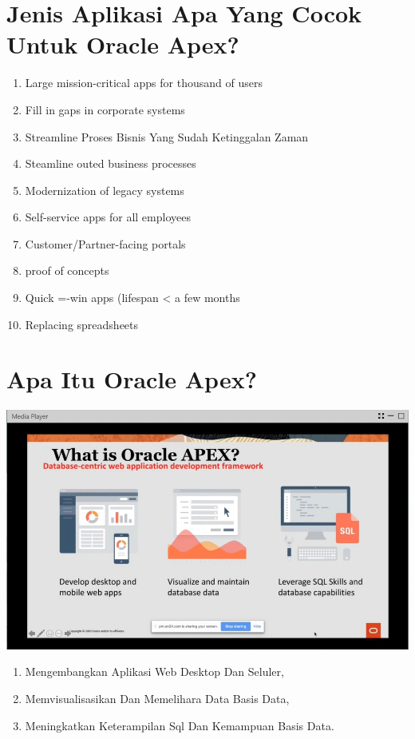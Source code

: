 \documentclass{article}
\begin{document}
\section{Jenis Aplikasi Apa Yang Cocok Untuk Oracle Apex?}
\begin{enumerate}
    \item Large mission-critical apps for thousand of users
    \item Fill in gaps in corporate systems
    \item Streamline Proses Bisnis Yang Sudah Ketinggalan Zaman
    \item Steamline outed business processes
    \item Modernization of legacy systems
    \item Self-service apps for all employees
    \item Customer/Partner-facing portals
    \item proof of concepts
    \item Quick =-win apps (lifespan < a few months
    \item Replacing spreadsheets
\end{enumerate}
\newpage
\section{Apa Itu Oracle Apex?}
\usepackage{Kerangka kerja pengembangan aplikasi web database-centric.}
\begin{center}
    \includegraphics[width=10cm\textwidth]{gambar/1.jpg}
    \end{center}
\begin{enumerate}
    \item Mengembangkan Aplikasi Web Desktop Dan Seluler, 
    \item Memvisualisasikan Dan Memelihara Data Basis Data, 
    \item Meningkatkan Keterampilan Sql Dan Kemampuan Basis Data.

\end{enumerate}
\end{document}
